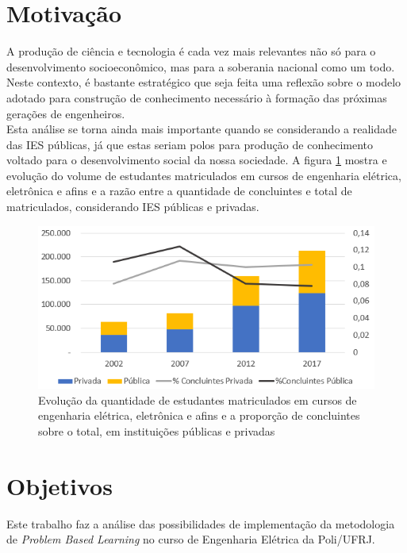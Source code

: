 	

	\section{Motivação}

		A produção de ciência e tecnologia é cada vez mais relevantes não só para o desenvolvimento socioeconômico, mas para a soberania nacional como um todo. Neste contexto, é bastante estratégico que seja feita uma reflexão sobre o modelo adotado para construção de conhecimento necessário à formação das próximas gerações de engenheiros.\\
		
		Esta análise se torna ainda mais importante quando se considerando a realidade das IES públicas, já que estas seriam polos para produção de conhecimento voltado para o desenvolvimento social da nossa sociedade. A figura \ref{fig:evolucaomatriculadosconcluintes} mostra e evolução do volume de estudantes matriculados em cursos de engenharia elétrica, eletrônica e afins e a razão entre a quantidade de concluintes e total de matriculados, considerando IES públicas e privadas.
		
		\begin{figure}[h!]
			\centering
			\includegraphics[width=0.75\linewidth]{Figuras/evolucao_matriculados_concluintes}
			\caption[Evolução de matriculados em cursos de engenharia elétrica, eletrônica e afins]{Evolução da quantidade de estudantes matriculados em cursos de engenharia elétrica, eletrônica e afins e a proporção de concluintes sobre o total, em instituições públicas e privadas}
			\label{fig:evolucaomatriculadosconcluintes}
		\end{figure}
		
		
	\section{Objetivos}
	
		Este trabalho faz a análise das possibilidades de implementação da metodologia de \textit{Problem Based Learning} no curso de Engenharia Elétrica da Poli/UFRJ.
		
